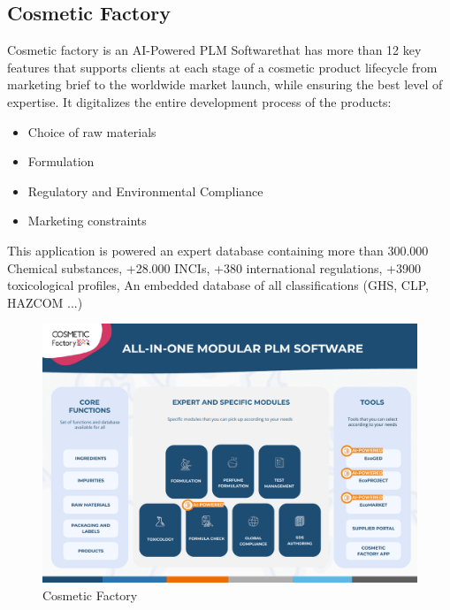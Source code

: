 \documentclass[a4paper,12pt,twoside]{report}
\begin{document}
\subsection{Cosmetic Factory}
Cosmetic factory is an AI-Powered PLM Softwarethat has more than 12 key features that supports clients at each stage of a cosmetic product lifecycle from marketing brief to the worldwide market launch, while ensuring the best level of expertise. It digitalizes the entire development process of the products: 
\begin{itemize}
\item Choice of raw materials
\item Formulation
\item Regulatory and Environmental Compliance
\item Marketing constraints
\end{itemize}
This application is powered an expert database containing more than 300.000 Chemical substances, +28.000 INCIs, +380 international regulations, +3900 toxicological profiles, An embedded database of all classifications (GHS, CLP, HAZCOM ...)
\begin{figure}[H]
		\includegraphics[width=\textwidth]{images/cf_ALLinONE}
	\caption[CF All in One]{Cosmetic Factory}
	\label{cfAiO}
\end{figure}
\end{document}
